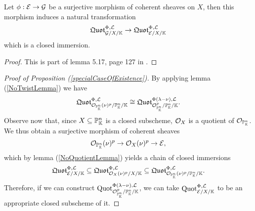 \begin{lemma}\label{NoQuotientLemma}
Let $\phi:\mathcal{E}\to\mathcal{G}$ be a surjective morphism of coherent sheaves on $X$, then this morphism induces a natural transformation \[\mathfrak{Quot}^{\Phi,\mathcal{L}}_{\mathcal{G}/X/\mathbb{K}}\to \mathfrak{Quot}^{\Phi,\mathcal{L}}_{\mathcal{E}/X/\mathbb{K}}\]
which is a closed immersion.
\end{lemma}
\begin{proof}
This is part of lemma 5.17, page 127 in \cite{FGAEXPLAINED}.
\end{proof}


\begin{proof}[Proof of Proposition (\ref{specialCaseOfExistence})]
By applying lemma (\ref{NoTwistLemma}) we have
\[\mathfrak{Quot}^{\Phi,\mathcal{L}}_{\mathcal{O}_{\mathbb{P}^n_{\mathbb{K}}}(\nu)^p/\mathbb{P}^n_{\mathbb{K}}/\mathbb{K}}\cong \mathfrak{Quot}^{\Phi(\lambda-\nu),\mathcal{L}}_{\mathcal{O}_{\mathbb{P}^n_{\mathbb{K}}}^p/\mathbb{P}^n_{\mathbb{K}}/\mathbb{K}}.\]
Observe now that, since $X\subseteq \mathbb{P}^n_{\mathbb{K}}$ is a closed subscheme, $\mathcal{O}_X$ is a quotient of $\mathcal{O}_{\mathbb{P}^n_{\mathbb{K}}}$. We thus obtain a surjective morphism of coherent sheaves
\[\mathcal{O}_{\mathbb{P}^n_{\mathbb{K}}}(\nu)^p\to \mathcal{O}_X(\nu)^p\to \mathcal{E},\]
which by lemma (\ref{NoQuotientLemma}) yields a chain of closed immersions
\[\mathfrak{Quot}^{\Phi,\mathcal{L}}_{\mathcal{E}/X/\mathbb{K}}\subseteq \mathfrak{Quot}^{\Phi,\mathcal{L}}_{\mathcal{O}_X(\nu)^p/X/\mathbb{K}}\subseteq\mathfrak{Quot}^{\Phi,\mathcal{L}}_{\mathcal{O}_{\mathbb{P}^n_{\mathbb{K}}}(\nu)^p/\mathbb{P}^n_{\mathbb{K}}/\mathbb{K}}.\]
Therefore, if we can construct $\mathrm{Quot}^{\Phi(\lambda-\nu),\mathcal{L}}_{\mathcal{O}^p_{\mathbb{P}^n_{\mathbb{K}}}/\mathbb{P}^n_{\mathbb{K}}/\mathbb{K}}$, we can take $\mathrm{Quot}^{\Phi,\mathcal{L}}_{\mathcal{E}/X/\mathbb{K}}$ to be an appropriate closed subscheme of it.
\end{proof}


